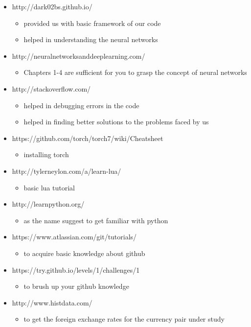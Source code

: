 \documentclass{article}
\begin{document}
	\begin{itemize}
		\item http://dark02bs.github.io/ 
 			\begin{itemize}
				\item provided us with basic framework of our code
				\item helped in understanding the neural networks
			\end{itemize}
		\item  http://neuralnetworksanddeeplearning.com/
			\begin{itemize}
				\item Chapters 1-4 are sufficient for you to grasp the concept of neural networks
			\end{itemize}
		\item http://stackoverflow.com/
			\begin{itemize}
				\item helped in debugging errors in the code
				\item helped in finding better solutions to the problems faced by us
			\end{itemize}
		\item https://github.com/torch/torch7/wiki/Cheatsheet
			\begin{itemize}
				\item installing torch
			\end{itemize}
		\item http://tylerneylon.com/a/learn-lua/
			\begin{itemize}
				\item basic lua tutorial
			\end{itemize}
		\item http://learnpython.org/
			\begin{itemize}
				\item as the name suggest to get familiar with python
			\end{itemize}
		\item https://www.atlassian.com/git/tutorials/
			\begin{itemize}
				\item to acquire basic knowledge about github
			\end{itemize}
		\item https://try.github.io/levels/1/challenges/1 			\begin{itemize}
				\item to brush up your github knowledge
			\end{itemize}
		\item http://www.histdata.com/
			\begin{itemize}
				\item to get the foreign exchange rates for the currency pair under study
			\end{itemize}
	\end{itemize}
 
\end{document}
